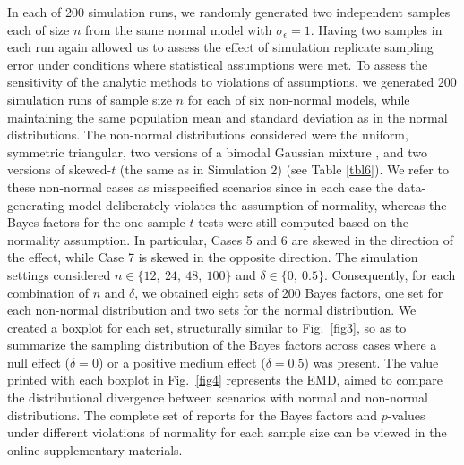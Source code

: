 \documentclass[preprint,12pt,authoryear]{elsarticle}
\begin{document}
In each of 200 simulation runs, we randomly generated two independent samples each of size $n$ from the same normal model with $\sigma_\epsilon=1$. Having two samples in each run again allowed us to assess the effect of simulation replicate sampling error under conditions where statistical assumptions were met. To assess the sensitivity of the analytic methods to violations of assumptions, we generated 200 simulation runs of sample size $n$ for each of six non-normal models, while maintaining the same population mean and standard deviation as in the normal distributions. The non-normal distributions considered were the uniform, symmetric triangular, two versions of a bimodal Gaussian mixture \citep{millard_envstats_2024}, and two versions of skewed-$t$ (the same as in Simulation 2) (see Table  \ref{tbl6}). We refer to these non-normal cases as misspecified scenarios since in each case the data-generating model deliberately violates the assumption of normality, whereas the Bayes factors for the one-sample $t$-tests were still computed based on the normality assumption. In particular, Cases 5 and 6 are skewed in the direction of the effect, while Case 7 is skewed in the opposite direction. The simulation settings considered $n\in\{12,\ \!24,\ \!48,\ \!100\}$ and $\delta\in\{0,\ \!0.5\}$. Consequently, for each combination of $n$ and $\delta$, we obtained eight sets of 200 Bayes factors, one set for each non-normal distribution and two sets for the normal distribution. We created a boxplot for each set, structurally similar to Fig.~\ref{fig3}, so as to summarize the sampling distribution of the Bayes factors across cases where a null effect ($\delta=0$) or a positive medium effect ($\delta=0.5$) was present. The value printed with each boxplot in Fig.~\ref{fig4} represents the EMD, aimed to compare the distributional divergence between scenarios with normal and non-normal distributions. The complete set of reports for the Bayes factors and $p$-values under different violations of normality for each sample size can be viewed in the online supplementary materials.
\end{document}
